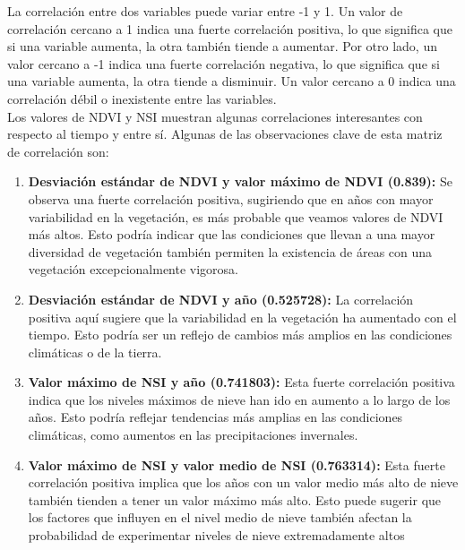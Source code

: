 La correlación entre dos variables puede variar entre -1 y 1. Un valor de correlación cercano a 1 indica una fuerte correlación positiva, lo que significa que si una variable aumenta, la otra también tiende a aumentar. Por otro lado, un valor cercano a -1 indica una fuerte correlación negativa, lo que significa que si una variable aumenta, la otra tiende a disminuir. Un valor cercano a 0 indica una correlación débil o inexistente entre las variables.\\

Los valores de NDVI y NSI muestran algunas correlaciones interesantes con respecto al tiempo y entre sí. Algunas de las observaciones clave de esta matriz de correlación son:\\
\begin{enumerate}
\item\textbf{Desviación estándar de NDVI y valor máximo de NDVI (0.839):} Se observa una fuerte correlación positiva, sugiriendo que en años con mayor variabilidad en la vegetación, es más probable que veamos valores de NDVI más altos. Esto podría indicar que las condiciones que llevan a una mayor diversidad de vegetación también permiten la existencia de áreas con una vegetación excepcionalmente vigorosa.\\

\item\textbf{Desviación estándar de NDVI y año (0.525728):}
La correlación positiva aquí sugiere que la variabilidad en la vegetación ha aumentado con el tiempo. Esto podría ser un reflejo de cambios más amplios en las condiciones climáticas o de la tierra.\\

\item\textbf{Valor máximo de NSI y año (0.741803):}
Esta fuerte correlación positiva indica que los niveles máximos de nieve han ido en aumento a lo largo de los años. Esto podría reflejar tendencias más amplias en las condiciones climáticas, como aumentos en las precipitaciones invernales.\\

\item\textbf{Valor máximo de NSI y valor medio de NSI (0.763314):} 
Esta fuerte correlación positiva implica que los años con un valor medio más alto de nieve también tienden a tener un valor máximo más alto. Esto puede sugerir que los factores que influyen en el nivel medio de nieve también afectan la probabilidad de experimentar niveles de nieve extremadamente altos\\


\end{enumerate}
